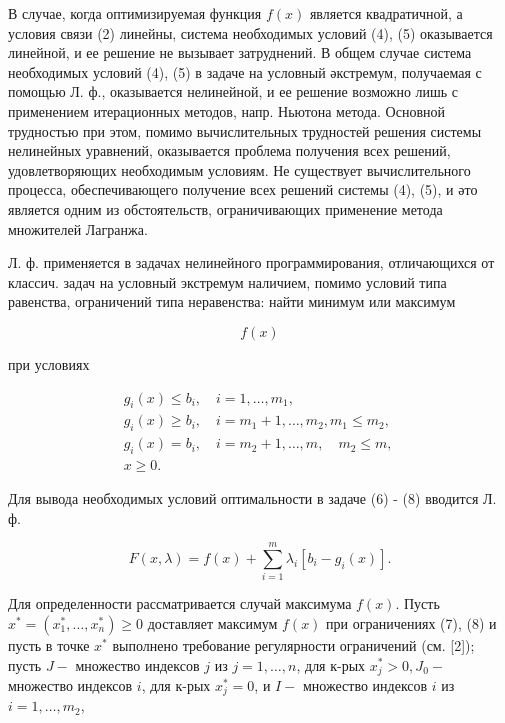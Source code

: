 \documentclass[10pt]{article}
\begin{document}
В случае, когда оптимизируемая функция $f(x)$ является квадратичной, а условия связи (2) линейны, система необходимых условий (4), (5) оказывается линейной, и ее решение не вызывает затруднений. В общем случае система необходимых условий (4), (5) в задаче на условный әкстремум, получаемая с помощью Л. ф., оказывается нелинейной, и ее решение возможно лишь с применением итерационных методов, напр. Ньютона метода. Основной трудностью при этом, помимо вычислительных трудностей решения системы нелинейных уравнений, оказывается проблема получения всех решений, удовлетворяющих необходимым условиям. Не существует вычислительного процесса, обеспечивающего получение всех решений системы (4), (5), и әто является одним из обстоятельств, ограничивающих применение метода множителей Лагранжа.



Л. ф. применяется в задачах нелинейного программирования, отличающихся от классич. задач на условный экстремум наличием, помимо условий типа равенства, ограничений типа неравенства: найти минимум или максимум



\[

f(x)

\]



при условиях



\[

\begin{aligned}

& g_{i}(x) \leqslant b_{i}, \quad i=1, \ldots, m_{1}, \\

& g_{i}(x) \geqslant b_{i}, \quad i=m_{1}+1, \ldots, m_{2}, m_{1} \leqslant m_{2}, \\

& g_{i}(x)=b_{i}, \quad i=m_{2}+1, \ldots, m, \quad m_{2} \leqslant m, \quad \\

& x \geqslant 0 .

\end{aligned}

\]



Для вывода необходимых условий оптимальности в задаче (6) - (8) вводится Л. ф.



\[

F(x, \lambda)=f(x)+\sum_{i=1}^{m} \lambda_{i}\left[b_{i}-g_{i}(x)\right] .

\]



Для определенности рассматривается случай максимума $f(x)$. Пусть $x^{*}=\left(x_{1}^{*}, \ldots, x_{n}^{*}\right) \geqslant 0$ доставляет максимум $f(x)$ при ограничениях (7), (8) и пусть в точке $x^{*}$ выполнено требование регулярности ограничений (см. [2]); пусть $J-$ множество индексов $j$ из $j=1, \ldots, n$, для к-рых $x_{j}^{*}>0, J_{0}-$ множество индексов $i$, для к-рых $x_{j}^{*}=0$, и $I-$ множество индексов $i$ из $i=1, \ldots, m_{2}$,
\end{document}
